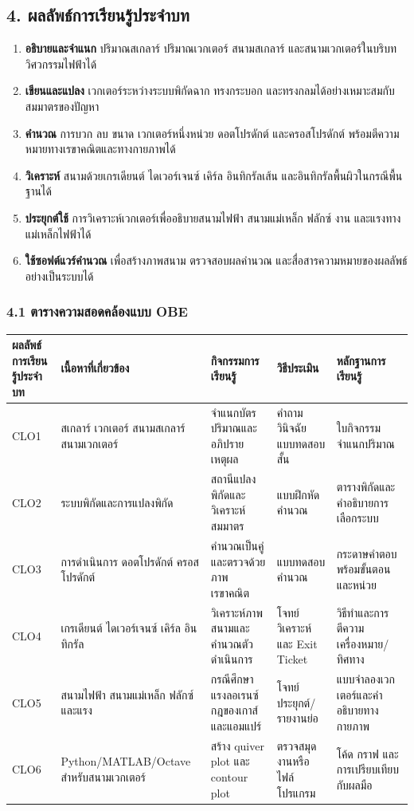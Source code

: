 \subsection{4. ผลลัพธ์การเรียนรู้ประจำบท}

\begin{enumerate}
\item \textbf{อธิบายและจำแนก} ปริมาณสเกลาร์ ปริมาณเวกเตอร์ สนามสเกลาร์ และสนามเวกเตอร์ในบริบทวิศวกรรมไฟฟ้าได้
\item \textbf{เขียนและแปลง} เวกเตอร์ระหว่างระบบพิกัดฉาก ทรงกระบอก และทรงกลมได้อย่างเหมาะสมกับสมมาตรของปัญหา
\item \textbf{คำนวณ} การบวก ลบ ขนาด เวกเตอร์หนึ่งหน่วย ดอตโปรดักต์ และครอสโปรดักต์ พร้อมตีความหมายทางเรขาคณิตและทางกายภาพได้
\item \textbf{วิเคราะห์} สนามด้วยเกรเดียนต์ ไดเวอร์เจนซ์ เคิร์ล อินทิกรัลเส้น และอินทิกรัลพื้นผิวในกรณีพื้นฐานได้
\item \textbf{ประยุกต์ใช้} การวิเคราะห์เวกเตอร์เพื่ออธิบายสนามไฟฟ้า สนามแม่เหล็ก ฟลักซ์ งาน และแรงทางแม่เหล็กไฟฟ้าได้
\item \textbf{ใช้ซอฟต์แวร์คำนวณ} เพื่อสร้างภาพสนาม ตรวจสอบผลคำนวณ และสื่อสารความหมายของผลลัพธ์อย่างเป็นระบบได้
\end{enumerate}

\subsubsection{4.1 ตารางความสอดคล้องแบบ OBE}

\begin{table}[htbp]
    \centering
    \begin{tabularx}{\textwidth}{L{0.10\textwidth} L{0.20\textwidth} L{0.24\textwidth} L{0.18\textwidth} Y}
        \hline
        \textbf{ผลลัพธ์การเรียนรู้ประจำบท} & \textbf{เนื้อหาที่เกี่ยวข้อง} & \textbf{กิจกรรมการเรียนรู้} & \textbf{วิธีประเมิน} & \textbf{หลักฐานการเรียนรู้} \\
        \hline
        CLO1 & สเกลาร์ เวกเตอร์ สนามสเกลาร์ สนามเวกเตอร์ & จำแนกบัตรปริมาณและอภิปรายเหตุผล & คำถามวินิจฉัย แบบทดสอบสั้น & ใบกิจกรรมจำแนกปริมาณ \\
        CLO2 & ระบบพิกัดและการแปลงพิกัด & สถานีแปลงพิกัดและวิเคราะห์สมมาตร & แบบฝึกหัดคำนวณ & ตารางพิกัดและคำอธิบายการเลือกระบบ \\
        CLO3 & การดำเนินการ ดอตโปรดักต์ ครอสโปรดักต์ & คำนวณเป็นคู่และตรวจด้วยภาพเรขาคณิต & แบบทดสอบคำนวณ & กระดาษคำตอบพร้อมขั้นตอนและหน่วย \\
        CLO4 & เกรเดียนต์ ไดเวอร์เจนซ์ เคิร์ล อินทิกรัล & วิเคราะห์ภาพสนามและคำนวณตัวดำเนินการ & โจทย์วิเคราะห์และ Exit Ticket & วิธีทำและการตีความเครื่องหมาย/ทิศทาง \\
        CLO5 & สนามไฟฟ้า สนามแม่เหล็ก ฟลักซ์ และแรง & กรณีศึกษาแรงลอเรนซ์ กฎของเกาส์ และแอมแปร์ & โจทย์ประยุกต์/รายงานย่อ & แบบจำลองเวกเตอร์และคำอธิบายทางกายภาพ \\
        CLO6 & Python/MATLAB/Octave สำหรับสนามเวกเตอร์ & สร้าง quiver plot และ contour plot & ตรวจสมุดงานหรือไฟล์โปรแกรม & โค้ด กราฟ และการเปรียบเทียบกับผลมือ \\
        \hline
    \end{tabularx}
\end{table}

